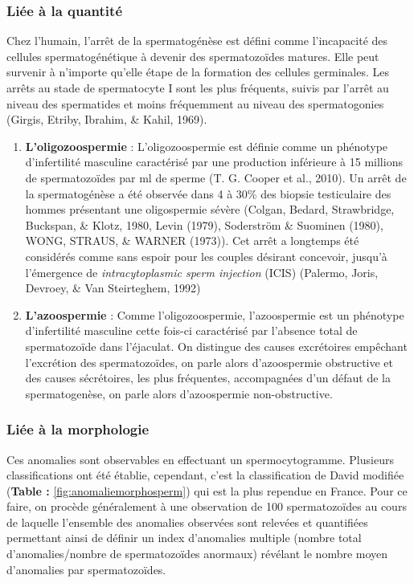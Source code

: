 \documentclass[12pt,twoside]{reedthesis}
\providecommand{\tightlist}{%
  \setlength{\itemsep}{0pt}\setlength{\parskip}{0pt}}
\theoremstyle{definition}
\theoremstyle{definition}
\theoremstyle{remark}
\begin{document}
  \subsubsection{Liée à la quantité}\label{liee-a-la-quantite}
  
  Chez l'humain, l'arrêt de la spermatogénèse est défini comme
  l'incapacité des cellules spermatogénétique à devenir des spermatozoïdes
  matures. Elle peut survenir à n'importe qu'elle étape de la formation
  des cellules germinales. Les arrêts au stade de spermatocyte I sont les
  plus fréquents, suivis par l'arrêt au niveau des spermatides et moins
  fréquemment au niveau des spermatogonies (Girgis, Etriby, Ibrahim, \&
  Kahil, 1969).
  
  \begin{enumerate}
  \def\labelenumi{\arabic{enumi}.}
  \tightlist
  \item
    \textbf{L'oligozoospermie} : L'oligozoospermie est définie comme un
    phénotype d'infertilité masculine caractérisé par une production
    inférieure à 15 millions de spermatozoïdes par ml de sperme (T. G.
    Cooper et al., 2010). Un arrêt de la spermatogénèse a été observée
    dans 4 à 30\% des biopsie testiculaire des hommes présentant une
    oligospermie sévère (Colgan, Bedard, Strawbridge, Buckspan, \& Klotz,
    1980, Levin (1979), Soderström \& Suominen (1980), WONG, STRAUS, \&
    WARNER (1973)). Cet arrêt a longtemps été considérés comme sans espoir
    pour les couples désirant concevoir, jusqu'à l'émergence de
    \emph{intracytoplasmic sperm injection} (ICIS) (Palermo, Joris,
    Devroey, \& Van Steirteghem, 1992)\\
  \item
    \textbf{L'azoospermie} : Comme l'oligozoospermie, l'azoospermie est un
    phénotype d'infertilité masculine cette fois-ci caractérisé par
    l'absence total de spermatozoïde dans l'éjaculat. On distingue des
    causes excrétoires empêchant l'excrétion des spermatozoïdes, on parle
    alors d'azoospermie obstructive et des causes sécrétoires, les plus
    fréquentes, accompagnées d'un défaut de la spermatogenèse, on parle
    alors d'azoospermie non-obstructive.
  \end{enumerate}
  
  \subsubsection{Liée à la morphologie}\label{liee-a-la-morphologie}
  
  Ces anomalies sont observables en effectuant un spermocytogramme.
  Plusieurs classifications ont été établie, cependant, c'est la
  classification de David modifiée (\textbf{Table :}
  \ref{fig:anomaliemorphosperm}) qui est la plus rependue en France. Pour
  ce faire, on procède généralement à une observation de 100
  spermatozoïdes au cours de laquelle l'ensemble des anomalies observées
  sont relevées et quantifiées permettant ainsi de définir un index
  d'anomalies multiple (nombre total d'anomalies/nombre de spermatozoïdes
  anormaux) révélant le nombre moyen d'anomalies par spermatozoïdes.
  
\end{document}
